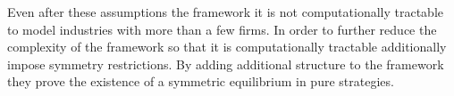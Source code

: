 \documentclass[12pt]{article}
\begin{document}
Even after these assumptions the framework it is not computationally tractable to model industries with more than a few firms.
In order to further reduce the complexity of the framework so that it is computationally tractable \citet{2010_Doraszelski_Satterthwaite_RAND} additionally impose symmetry restrictions. By adding additional structure to the framework they prove the existence of a symmetric equilibrium in pure strategies.



\end{document}
